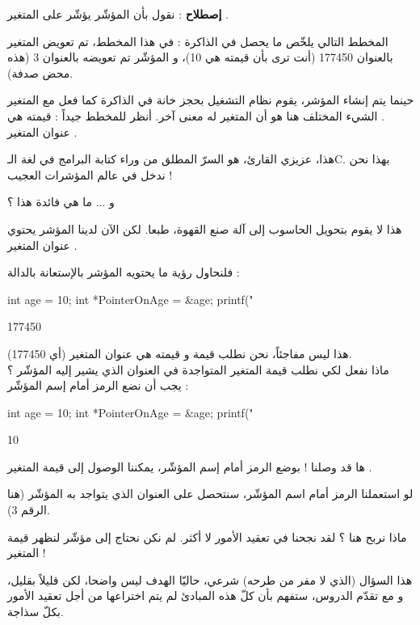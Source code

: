 \textbf{إصطلاح}
: نقول بأن المؤشّر
يؤشّر على المتغير
.

المخطط التالي يلخّص ما يحصل في الذاكرة :
في هذا المخطط، تم تعويض المتغير
بالعنوان 177450 (أنت ترى بأن قيمته هي 10)، و المؤشّر
تم تعويضه بالعنوان 3 (هذه محض صدفة).

حينما يتم إنشاء المؤشر، يقوم نظام التشغيل بحجز خانة في الذاكرة كما فعل مع المتغير
.
الشيء المختلف هنا هو أن المتغير
له معنى آخر. أنظر للمخطط جيداً : قيمته هي عنوان المتغير
.

هذا، عزيزي القارئ، هو السرّ المطلق من وراء كتابة البرامج في لغة الـ\textenglish{C}.
بهذا نحن ندخل في عالم المؤشرات العجيب !
\begin{question}
	و ... ما هي فائدة هذا ؟
\end{question}
هذا لا يقوم بتحويل الحاسوب إلى آلة صنع القهوة، طبعا. لكن الآن لدينا المؤشر
يحتوي عنوان المتغير
.

فلنحاول رؤية ما يحتويه المؤشر بالإستعانة بالدالة
 :
\begin{Csource}
int age = 10;
int *PointerOnAge = &age;
printf("%
\end{Csource}
\begin{Console}
177450
\end{Console}
هذا ليس مفاجئاً، نحن نطلب قيمة
و قيمته هي عنوان المتغير
(أي 177450).\\
ماذا نفعل لكي نطلب قيمة المتغير المتواجدة في العنوان الذي يشير إليه المؤشّر
؟ يجب أن نضع الرمز
\InlineCode{*}
أمام إسم المؤشّر :
\begin{Csource}
int age = 10;
int *PointerOnAge = &age;
printf("%
\end{Csource}
\begin{Console}
10
\end{Console}
ها قد وصلنا ! بوضع الرمز
\InlineCode{*}
أمام إسم المؤشّر، يمكننا الوصول إلى قيمة المتغير
.

لو استعملنا الرمز
\InlineCode{\&}
أمام اسم المؤشّر، سنتحصل على العنوان الذي يتواجد به المؤشّر (هنا الرقم 3).
\begin{question}
	ماذا نربح هنا ؟ لقد نجحنا في تعقيد الأمور لا أكثر. لم نكن نحتاج إلى مؤشّر لنظهر قيمة المتغير
 !
\end{question}
هذا السؤال (الذي لا مفر من طرحه) شرعي، حاليّا الهدف ليس واضحا، لكن قليلاً بقليل، و مع تقدّم الدروس، ستفهم بأن كلّ هذه المبادئ لم يتم اختراعها من أجل تعقيد الأمور بكلّ سذاجة.

